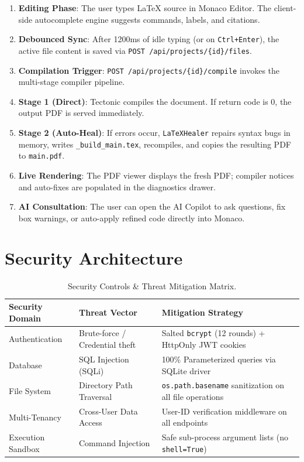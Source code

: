 \documentclass[11pt,a4paper]{article}
\begin{document}
\begin{enumerate}
    \item \textbf{Editing Phase}: The user types LaTeX source in Monaco Editor. The client-side autocomplete engine suggests commands, labels, and citations.
    \item \textbf{Debounced Sync}: After 1200ms of idle typing (or on \texttt{Ctrl+Enter}), the active file content is saved via \texttt{POST /api/projects/\{id\}/files}.
    \item \textbf{Compilation Trigger}: \texttt{POST /api/projects/\{id\}/compile} invokes the multi-stage compiler pipeline.
    \item \textbf{Stage 1 (Direct)}: Tectonic compiles the document. If return code is 0, the output PDF is served immediately.
    \item \textbf{Stage 2 (Auto-Heal)}: If errors occur, \texttt{LaTeXHealer} repairs syntax bugs in memory, writes \texttt{\_build\_main.tex}, recompiles, and copies the resulting PDF to \texttt{main.pdf}.
    \item \textbf{Live Rendering}: The PDF viewer displays the fresh PDF; compiler notices and auto-fixes are populated in the diagnostics drawer.
    \item \textbf{AI Consultation}: The user can open the AI Copilot to ask questions, fix box warnings, or auto-apply refined code directly into Monaco.
\end{enumerate}

\section{Security Architecture}

\begin{table}[htbp]
\centering
\begin{tabular}{@{}lll@{}}
\toprule
\textbf{Security Domain} & \textbf{Threat Vector} & \textbf{Mitigation Strategy} \\
\midrule
Authentication & Brute-force / Credential theft & Salted \texttt{bcrypt} (12 rounds) + HttpOnly JWT cookies \\
Database & SQL Injection (SQLi) & 100\% Parameterized queries via SQLite driver \\
File System & Directory Path Traversal & \texttt{os.path.basename} sanitization on all file operations \\
Multi-Tenancy & Cross-User Data Access & User-ID verification middleware on all endpoints \\
Execution Sandbox & Command Injection & Safe sub-process argument lists (no \texttt{shell=True}) \\
\bottomrule
\end{tabular}
\caption{Security Controls \& Threat Mitigation Matrix.}
\label{tab:security}
\end{table}
\end{document}

